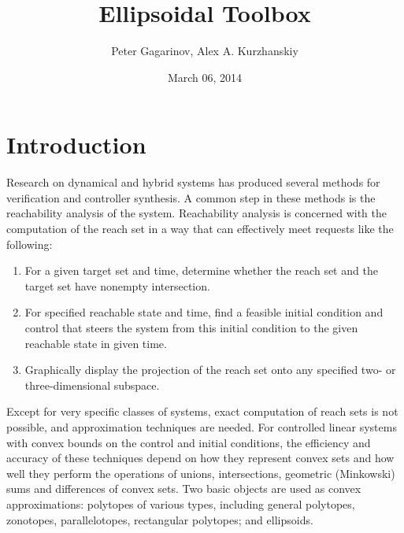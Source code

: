 \documentclass[letterpaper,10pt,english]{sphinxmanual}
\title{Ellipsoidal Toolbox}
\date{March 06, 2014}
\author{Peter Gagarinov, Alex A. Kurzhanskiy}
\begin{document}
\maketitle
\tableofcontents
{}\label{main_manual::doc}



\chapter{Introduction}
\label{chap_intro:introduction}\label{chap_intro::doc}\label{chap_intro:welcome-to-ellipsoidal-toolbox-documentation}
Research on dynamical and hybrid systems has produced several methods
for verification and controller synthesis. A common step in these
methods is the reachability analysis of the system. Reachability
analysis is concerned with the computation of the reach set in a way
that can effectively meet requests like the following:
\begin{enumerate}
\item {} 
For a given target set and time, determine whether the reach set and
the target set have nonempty intersection.

\item {} 
For specified reachable state and time, find a feasible initial
condition and control that steers the system from this initial
condition to the given reachable state in given time.

\item {} 
Graphically display the projection of the reach set onto any
specified two- or three-dimensional subspace.

\end{enumerate}

Except for very specific classes of systems, exact computation of reach
sets is not possible, and approximation techniques are needed. For
controlled linear systems with convex bounds on the control and initial
conditions, the efficiency and accuracy of these techniques depend on
how they represent convex sets and how well they perform the operations
of unions, intersections, geometric (Minkowski) sums and differences of
convex sets. Two basic objects are used as convex approximations:
polytopes of various types, including general polytopes, zonotopes,
parallelotopes, rectangular polytopes; and ellipsoids.
\end{document}
